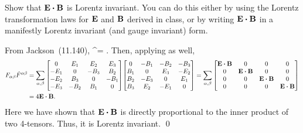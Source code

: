 \begin{statement}{\hspace{-1em}}
	Show that $\vE \vdot \vB$ is Lorentz invariant.  You can do this either by using the Lorentz transformation laws for $\vb{E}$ and $\vb{B}$ derived in class, or by writing $\vE \vdot \vB$ in a manifestly Lorentz invariant (and gauge invariant) form.
\end{statement}

\newcommand{\Ft}{\tilde{F}}
\newcommand{\Fsab}{F_{\alp \bet}}
\newcommand{\Ftab}{\Ft^{\alp \bet}}
\newcommand{\Ftsmn}{\Ft_{\alp \bet}}
\newcommand{\sumab}{\sum_{\alp, \bet}}

\newcommand{\Fsmat}{\mqty[	0 & \Eq & \Ew & \Ee \\
						-\Eq & 0 & -\Be & \Bw \\
						-\Ew & \Be & 0 & -\Bq \\
						-\Ee & -\Bw & \Bq & 0 ]}
\newcommand{\Ftmat}{\mqty[	0 & -\Bq & -\Bw & -\Be \\
						\Bq & 0 & \Ee & -\Ew \\
						\Bw & -\Ee & 0 & \Eq \\
						\Be & \Ew & -\Eq & 0 ]}

\begin{solution}
	From Jackson~(11.140),
	\beq
		\Ftab = \Ftmat.
	\eeq
	Then, applying  as well,
	\begin{align*}
		\Fsab \Ftab &= \sumab \Fsmat \Ftmat
		= \sumab \mqty[\vE \vdot \vB & 0 & 0 & 0 \\
					0 & \vE \vdot \vB & 0 & 0 \\
					0 & 0 & \vE \vdot \vB & 0 \\
					0 & 0 & 0 & \vE \vdot \vB ] \\
		&= 4 \vE \vdot \vB.
	\end{align*}
	Here we have shown that $\vE \vdot \vB$ is directly proportional to the inner product of two 4-tensors.  Thus, it is Lorentz invariant. \qed
\end{solution}